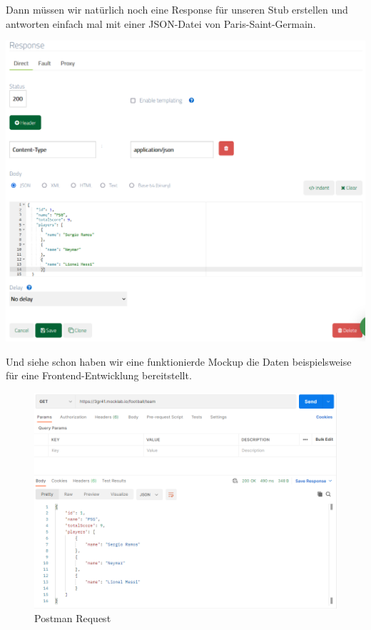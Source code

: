 \newpage

Dann müssen wir natürlich noch eine Response für unseren Stub erstellen und antworten einfach mal mit einer
JSON-Datei von Paris-Saint-Germain.
\bigskip

\includegraphics[scale=0.5]{pics/mocklab-tutorial/response.PNG}

Und siehe schon haben wir eine funktionierde Mockup die Daten beispielsweise für eine Frontend-Entwicklung
bereitstellt.
\begin{figure}[h]
    \includegraphics[scale=0.5]{pics/mocklab-tutorial/postman.PNG}
    \caption{Postman Request}
\end{figure}